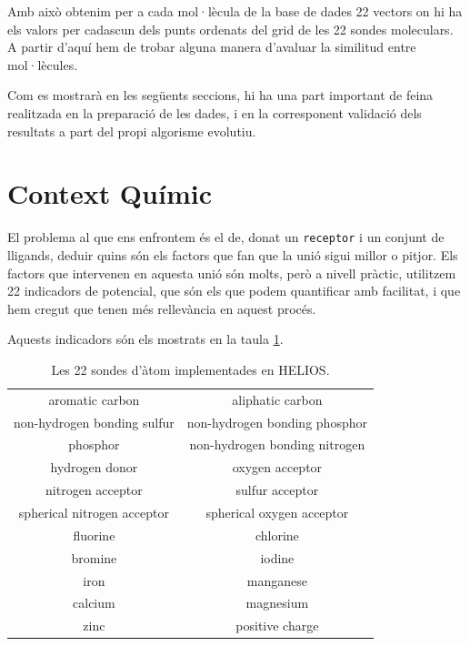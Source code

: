 Amb això obtenim per a cada mol·lècula de la base de dades 22 vectors on hi ha els valors per cadascun dels punts ordenats del grid de les 22 sondes moleculars. A partir d'aquí hem de trobar alguna manera d'avaluar la similitud entre mol·lècules.

Com es mostrarà en les següents seccions, hi ha una part important de feina
realitzada en la preparació de les dades, i en la corresponent validació dels
resultats a part del propi algorisme evolutiu.


\section{Context Químic} %
\label{sec:Context Quimic}

El problema al que ens enfrontem és el de, donat un \texttt{receptor} i un conjunt de %
lligands, deduir quins són els factors que fan que la unió sigui millor
o pitjor.  Els factors que intervenen en aquesta unió són molts, però a nivell
pràctic, utilitzem 22 indicadors de potencial, que són els que podem quantificar amb
facilitat, i que hem cregut que tenen més rellevància en aquest procés.

Aquests indicadors són els mostrats en la taula \ref{table:maps}.

\begin{table}
\centering
\begin{tabular}{|cc|}
\hline
aromatic carbon             & aliphatic carbon\\
non-hydrogen bonding sulfur & non-hydrogen bonding phosphor\\
phosphor                    & non-hydrogen bonding nitrogen\\
hydrogen donor              & oxygen acceptor\\
nitrogen acceptor           & sulfur acceptor\\
spherical nitrogen acceptor & spherical oxygen acceptor\\
fluorine                    & chlorine\\
bromine                     & iodine\\
iron                        & manganese\\
calcium                     & magnesium\\
zinc                        & positive charge\\
\hline
\end{tabular}
\caption{Les 22 sondes d'àtom implementades en HELIOS.}
\label{table:maps}
\end{table}

